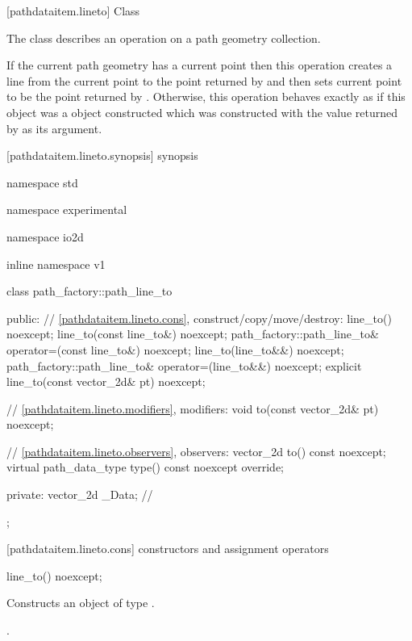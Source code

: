  [pathdataitem.lineto] {Class }

\pnum
{}
The class  describes an operation on a path geometry collection.

\pnum
If the current path geometry has a current point then this operation creates a line from the current point to the point returned by  and then sets current point to be the point returned by . Otherwise, this operation behaves exactly as if this object was a  object constructed which was constructed with the value returned by  as its argument.

 [pathdataitem.lineto.synopsis] { synopsis}

\begin{codeblock}
namespace std { namespace experimental { namespace io2d { inline namespace v1 {
  class path_factory::path_line_to {
  public:
    // \ref{pathdataitem.lineto.cons}, construct/copy/move/destroy:
    line_to() noexcept;
    line_to(const line_to&) noexcept;
    path_factory::path_line_to& operator=(const line_to&) noexcept;
    line_to(line_to&&) noexcept;
    path_factory::path_line_to& operator=(line_to&&) noexcept;
    explicit line_to(const vector_2d& pt) noexcept;

    // \ref{pathdataitem.lineto.modifiers}, modifiers:
    void to(const vector_2d& pt) noexcept;

    // \ref{pathdataitem.lineto.observers}, observers:
    vector_2d to() const noexcept;
    virtual path_data_type type() const noexcept override;
    
  private:
    vector_2d _Data; // \expos
  };
} } } }
\end{codeblock}

 [pathdataitem.lineto.cons] { constructors and assignment operators}

\begin{itemdecl}
    line_to() noexcept;
\end{itemdecl}
\begin{itemdescr}
	\pnum
	\effects
	Constructs an object of type .
	
	\pnum
	\postconditions
	.
\end{itemdescr}


